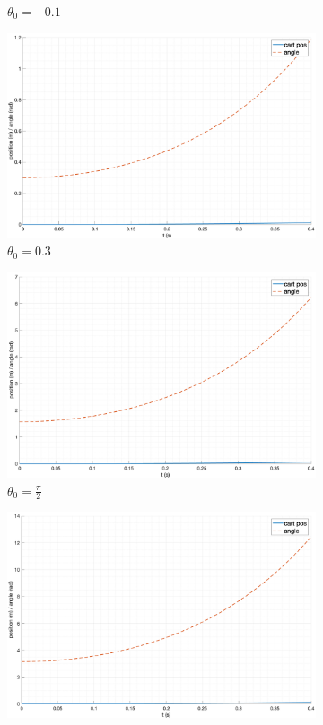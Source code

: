 \begin{figure}[ht!]
\begin{subfigure}[b]{0.45\textwidth}
        \caption{$\theta_0 = -0.1$}
    \end{subfigure}
    \begin{subfigure}[b]{0.45\textwidth}
        \includegraphics[width=\textwidth]{media/plots/free_motion/lin_4.png}
        \caption{$\theta_0 = 0.3$}
    \end{subfigure}
    \begin{subfigure}[b]{0.45\textwidth}
        \includegraphics[width=\textwidth]{media/plots/free_motion/lin_5.png}
        \caption{$\theta_0 = \frac{\pi}{2}$}
    \end{subfigure}
    \begin{subfigure}[b]{0.45\textwidth}
        \includegraphics[width=\textwidth]{media/plots/free_motion/lin_6.png}

\end{subfigure}
\end{figure}
